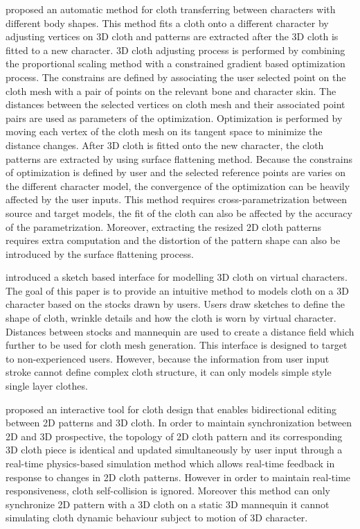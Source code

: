  proposed an automatic method for cloth transferring between characters with different body shapes. This method fits a cloth onto a different character by adjusting vertices on 3D cloth and patterns are extracted after the 3D cloth is fitted to a new character. 3D cloth adjusting process is performed by combining the proportional scaling method with a constrained gradient based optimization process. The constrains are defined by associating the user selected point on the cloth mesh with a pair of points on the relevant bone and character skin. The distances between the selected vertices on cloth mesh and their associated point pairs are used as parameters of the optimization. Optimization is performed by moving each vertex of the cloth mesh on its tangent space to minimize the distance changes. After 3D cloth is fitted onto the new character, the cloth patterns are extracted by using surface flattening method. Because the constrains of optimization is defined by user and the selected reference points are varies on the different character model, the convergence of the optimization can be heavily affected by the user inputs. This method requires cross-parametrization between source and target models, the fit of the cloth can also be affected by the accuracy of the parametrization. Moreover, extracting the resized 2D cloth patterns requires extra computation and the distortion of the pattern shape can also be introduced by the surface flattening process. 

 introduced a sketch based interface for modelling 3D cloth on virtual characters. The goal of this paper is to provide an intuitive method to models cloth on a 3D character based on the stocks drawn by users. Users draw sketches to define the shape of cloth, wrinkle details and how the cloth is worn by virtual character. Distances between stocks and mannequin are used to create a distance field which further to be used for cloth mesh generation. This interface is designed to target to non-experienced users. However, because the information from user input stroke cannot define complex cloth structure, it can only models simple style single layer clothes. 

 proposed an interactive tool for cloth design that enables bidirectional editing between 2D patterns and 3D cloth. In order to maintain synchronization between 2D and 3D prospective, the topology of 2D cloth pattern and its corresponding 3D cloth piece is identical and updated simultaneously by user input through a real-time physics-based simulation method which allows real-time feedback in response to changes in 2D cloth patterns. However in order to maintain real-time responsiveness, cloth self-collision is ignored. Moreover this method can only synchronize 2D pattern with a 3D cloth on a static 3D mannequin it cannot simulating cloth dynamic behaviour subject to motion of 3D character.


